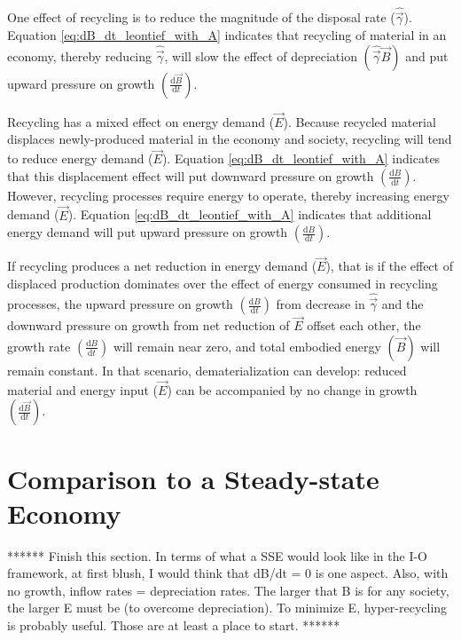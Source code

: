 One effect of recycling is to reduce the magnitude of the disposal rate ($\hat{\vec{\gamma}}$). Equation \ref{eq:dB_dt_leontief_with_A} indicates that recycling of material in an economy, thereby reducing $\hat{\vec{\gamma}}$, will slow the effect of depreciation $\left(\hat{\vec{\gamma}}\vec{B}\right)$ and put upward pressure on growth $\left(\frac{\mathrm{d}\vec{B}}{\mathrm{d}t}\right)$. 

Recycling has a mixed effect on energy demand ($\vec{E}$). Because recycled material displaces newly-produced material in the economy and society, recycling will tend to reduce energy demand ($\vec{E}$). Equation \ref{eq:dB_dt_leontief_with_A} indicates that this displacement effect will put downward pressure on growth $\left(\frac{\mathrm{d}B}{\mathrm{d}t}\right)$. However, recycling processes require energy to operate, thereby increasing energy demand ($\vec{E}$). Equation \ref{eq:dB_dt_leontief_with_A} indicates that additional energy demand will put upward pressure on growth $\left(\frac{\mathrm{d}B}{\mathrm{d}t}\right)$. 

If recycling produces a net reduction in energy demand ($\vec{E}$), that is if the effect of displaced production dominates over the effect of energy consumed in recycling processes, the upward pressure on growth $\left(\frac{\mathrm{d}B}{\mathrm{d}t}\right)$ from decrease in $\hat{\vec{\gamma}}$ and the downward pressure on growth from net reduction of $\vec{E}$ offset each other, the growth rate $\left(\frac{\mathrm{d}B}{\mathrm{d}t}\right)$ will remain near zero, and total embodied energy $(\vec{B})$ will remain constant. In that scenario, dematerialization can develop: reduced material and energy input ($\vec{E}$) can be accompanied by no change in growth $\left(\frac{\mathrm{d}\vec{B}}{\mathrm{d}t}\right)$.


\section{Comparison to a Steady-state Economy}



****** Finish this section. In terms of what a SSE would look like in the I-O framework, at first blush, I would think that dB/dt = 0 is one aspect.  Also, with no growth, inflow rates = depreciation rates.  The larger that B is for any society, the larger E must be (to overcome depreciation).  To minimize E, hyper-recycling is probably useful.  Those are at least a place to start. ******

